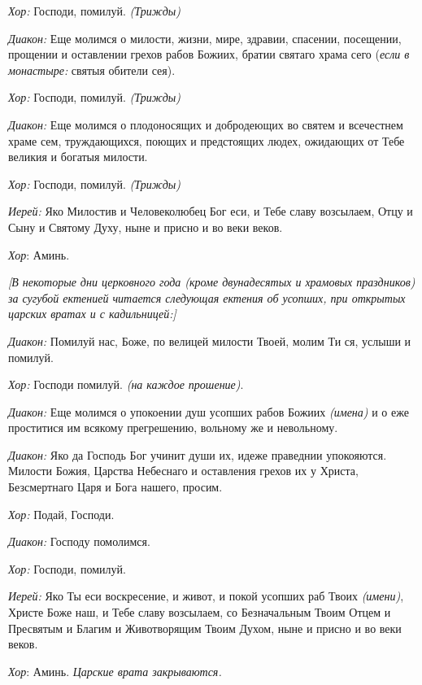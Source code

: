 \begin{mymulticols}
{\itshape Хор:} Господи, помилуй. {\itshape (Трижды)} 

{\itshape Диакон:} Еще молимся о милости, жизни, мире, здравии, спасении, посещении, прощении и оставлении грехов рабов Божиих, братии святаго храма сего ({\itshape если в монастыре:} святыя обители сея). 

{\itshape Хор:} Господи, помилуй. {\itshape (Трижды)} 

{\itshape Диакон:} Еще молимся о плодоносящих и добродеющих во святем и всечестнем храме сем, труждающихся, поющих и предстоящих людех, ожидающих от Тебе великия и богатыя милости.

{\itshape Хор:} Господи, помилуй. {\itshape (Трижды)} 

{\itshape Иерей:} Яко Милостив и Человеколюбец Бог еси, и Тебе славу возсылаем, Отцу и Сыну и Святому Духу, ныне и присно и во веки веков.


{\itshape Хор}: Аминь.



{\itshape [В некоторые дни церковного года (кроме двунадесятых и храмовых праздников) за сугубой ектенией читается следующая ектения об усопших, при открытых царских вратах и с кадильницей:]}

{\itshape Диакон:} Помилуй нас, Боже, по велицей милости Твоей, молим Ти ся, услыши и помилуй.


{\itshape Хор:} Господи помилуй. {\itshape (на каждое прошение)}. 


{\itshape Диакон:} Еще молимся о упокоении душ усопших рабов Божиих {\itshape (имена)} и о еже проститися им всякому прегрешению, вольному же и невольному.


{\itshape Диакон:} Яко да Господь Бог учинит души их, идеже праведнии упокояются. Милости Божия, Царства Небеснаго и оставления грехов их у Христа, Безсмертнаго Царя и Бога нашего, просим.


{\itshape Хор:} Подай, Господи.


{\itshape Диакон:} Господу помолимся.


{\itshape Хор:} Господи, помилуй.


{\itshape Иерей:} Яко Ты еси воскресение, и живот, и покой усопших раб Твоих {\itshape (имени)}, Христе Боже наш, и Тебе славу возсылаем, со Безначальным Твоим Отцем и Пресвятым и Благим и Животворящим Твоим Духом, ныне и присно и во веки веков.


{\itshape Хор}: Аминь. {\itshape Царские врата закрываются.}



\end{mymulticols}
